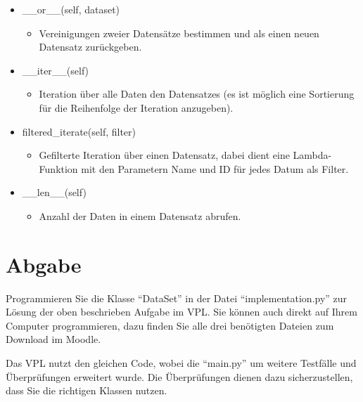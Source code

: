 \documentclass[
10pt,
a4paper
parskip=full
]{scrartcl}
\begin{document}
\begin{itemize}
            \item \_\_or\_\_(self, dataset)
                \begin{itemize}
                    \item [] Vereinigungen zweier Datensätze bestimmen und als einen neuen Datensatz zurückgeben.
                \end{itemize}
                
            \item \_\_iter\_\_(self)
                \begin{itemize}
                    \item [] Iteration über alle Daten den Datensatzes (es ist möglich eine Sortierung für die Reihenfolge der Iteration anzugeben).
                \end{itemize}
                
            \item filtered\_iterate(self, filter)
                \begin{itemize}
                    \item [] Gefilterte Iteration über einen Datensatz, dabei dient eine Lambda-Funktion mit den Parametern Name und ID für jedes Datum als Filter.
                \end{itemize}
                
            \item \_\_len\_\_(self)
                \begin{itemize}
                    \item [] Anzahl der Daten in einem Datensatz abrufen.
                \end{itemize}
        \end{itemize}
    \section{Abgabe}
    Programmieren Sie die Klasse "`DataSet"' in der Datei "`implementation.py"' zur Lösung der oben beschrieben Aufgabe im VPL. Sie können auch direkt auf Ihrem Computer programmieren, dazu finden Sie alle drei benötigten Dateien zum Download im Moodle.

    Das VPL nutzt den gleichen Code, wobei die "`main.py"' um weitere Testfälle und Überprüfungen erweitert wurde. Die Überprüfungen dienen dazu sicherzustellen, dass Sie die richtigen Klassen nutzen.
\end{document}
